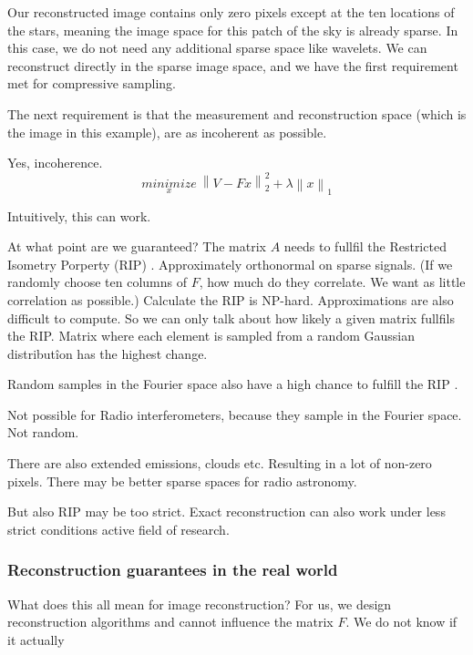 Our reconstructed image contains only zero pixels except at the ten locations of the stars, meaning the image space for this patch of the sky is already sparse. In this case, we do not need any additional sparse space like wavelets. We can reconstruct directly in the sparse image space, and we have the first requirement met for compressive sampling. 

The next requirement is that the measurement and reconstruction space (which is the image in this example), are as incoherent as possible. 

Yes, incoherence.
\begin{equation}\label{intro:linear:compressed2}
\underset{x}{minimize} \: \left \| V - Fx \right \|_2^2 + \lambda \left \| x \right \|_1
\end{equation}


Intuitively, this can work.


At what point are we guaranteed? The matrix $A$ needs to fullfil the Restricted Isometry Porperty (RIP) \cite{candes2006robust,donoho2006compressed}.
Approximately orthonormal on sparse signals. (If we randomly choose ten columns of $F$, how much do they correlate. We want as little correlation as possible.)
Calculate the RIP is NP-hard\cite{tillmann2013computational}. Approximations are also difficult to compute\cite{natarajan2014computational}.
So we can only talk about how likely a given matrix fullfils the RIP. Matrix where each element is sampled from a random Gaussian distributîon has the highest change.

Random samples in the Fourier space also have a high chance to fulfill the RIP \cite{haviv2017restricted}.

Not possible for Radio interferometers, because they sample in the Fourier space. Not random.

There are also extended emissions, clouds etc. Resulting in a lot of non-zero pixels. There may be better sparse spaces for radio astronomy.

But also RIP may be too strict. Exact reconstruction can also work under less strict conditions\cite{candes2011probabilistic} active field of research.

\subsubsection{Reconstruction guarantees in the real world}

What does this all mean for image reconstruction?
For us, we design reconstruction algorithms and cannot influence the matrix $F$. We do not know if it actually 

